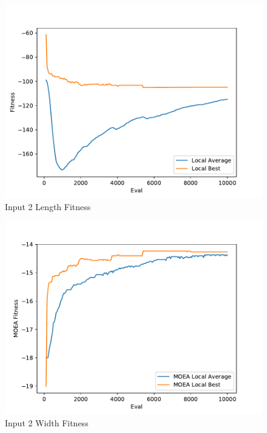 \documentclass{standalone}
\begin{document}
\begin{figure}[!htb]
	\caption{Input 2 Length Fitness}
	\label{fig:graph_2002}
	\includegraphics[width=\textwidth]{../graphs/graphs/2002.pdf}
\end{figure}


\begin{figure}[!htb]
	\caption{Input 2 Width Fitness}
	\label{fig:graph_2002_moea}
	\includegraphics[width=\textwidth]{../graphs/graphs/2002_moea.pdf}
\end{figure}
\end{document}

